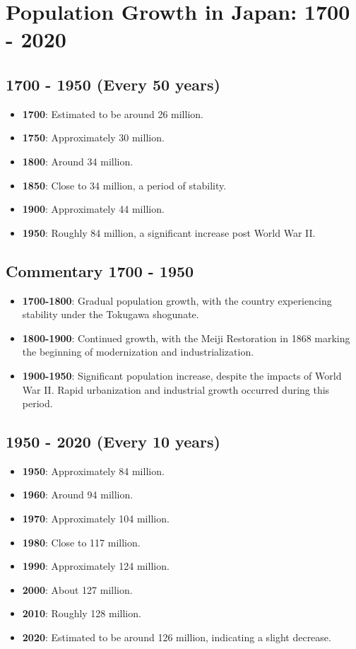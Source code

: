 \section*{Population Growth in Japan: 1700 - 2020}

\subsection*{1700 - 1950 (Every 50 years)}
\begin{itemize}
    \item \textbf{1700}: Estimated to be around 26 million.
    \item \textbf{1750}: Approximately 30 million.
    \item \textbf{1800}: Around 34 million.
    \item \textbf{1850}: Close to 34 million, a period of stability.
    \item \textbf{1900}: Approximately 44 million.
    \item \textbf{1950}: Roughly 84 million, a significant increase post World War II.
\end{itemize}

\subsection*{Commentary 1700 - 1950}
\begin{itemize}
    \item \textbf{1700-1800}: Gradual population growth, with the country experiencing stability under the Tokugawa shogunate.
    \item \textbf{1800-1900}: Continued growth, with the Meiji Restoration in 1868 marking the beginning of modernization and industrialization.
    \item \textbf{1900-1950}: Significant population increase, despite the impacts of World War II. Rapid urbanization and industrial growth occurred during this period.
\end{itemize}

\subsection*{1950 - 2020 (Every 10 years)}
\begin{itemize}
    \item \textbf{1950}: Approximately 84 million.
    \item \textbf{1960}: Around 94 million.
    \item \textbf{1970}: Approximately 104 million.
    \item \textbf{1980}: Close to 117 million.
    \item \textbf{1990}: Approximately 124 million.
    \item \textbf{2000}: About 127 million.
    \item \textbf{2010}: Roughly 128 million.
    \item \textbf{2020}: Estimated to be around 126 million, indicating a slight decrease.
\end{itemize}

